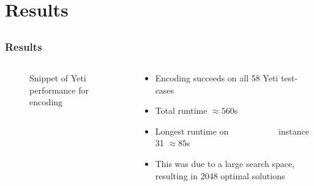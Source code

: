 \documentclass{beamer}
\begin{document}
\section{Results}
\subsection{}
\begin{frame}[fragile]
\frametitle{Results}
\begin{columns}[T]
\begin{column}{.48\textwidth}
\vspace{-10pt}
\begin{figure}
    \centering
    \setlength{\fboxsep}{0pt}
    \caption{Snippet of Yeti performance for encoding}
    \label{fig2}
\end{figure}
\end{column}
\begin{column}{.52\textwidth}
\begin{itemize}
    \setlength\itemsep{1.5em}
    \item Encoding succeeds on all 58 Yeti test-cases
    \item Total runtime $\approx 560$s
    \item Longest runtime on ~~~~~~~~~~~instance 31 $\approx 85$s
    \item This was due to a large search space, resulting in 2048 optimal solutions
\end{itemize}
\end{column}
\end{columns}
\end{frame}
\end{document}

